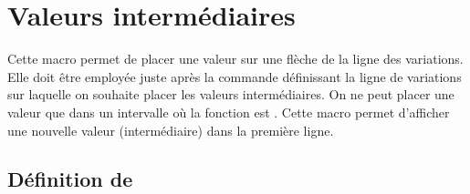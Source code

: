 \section{Valeurs intermédiaires }
Cette macro permet de placer une valeur sur une flèche de la ligne des variations. Elle doit être employée juste après la commande  définissant la ligne de variations sur laquelle on souhaite placer les valeurs intermédiaires. On ne peut placer une valeur que dans un intervalle où la fonction est . Cette macro permet d'afficher une nouvelle valeur (intermédiaire) dans la première ligne.

\subsection{Définition de   }

